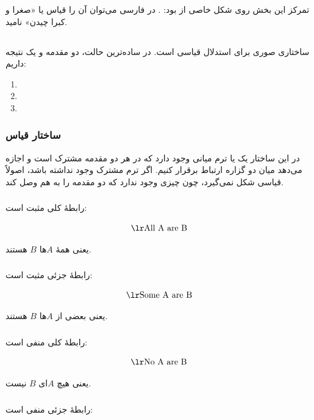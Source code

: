 تمرکز این بخش روی شکل خاصی از  بود: . در فارسی می‌توان آن را قیاس یا «صغرا و کبرا چیدن» نامید.

\subsection{}
 ساختاری صوری برای استدلال قیاسی است. در ساده‌ترین حالت، دو مقدمه و یک نتیجه داریم:

\begin{enumerate}
  \item {}
  \item {}
  \item {}
\end{enumerate}

\subsubsection{ساختار قیاس}
در این ساختار یک  یا ترم میانی وجود دارد که در هر دو مقدمه مشترک است و اجازه می‌دهد میان دو گزاره ارتباط برقرار کنیم. اگر ترم مشترک وجود نداشته باشد، اصولاً قیاسی شکل نمی‌گیرد، چون چیزی وجود ندارد که دو مقدمه را به هم وصل کند.

\subsubsection{}
 رابطهٔ کلی مثبت است:

\[
\text{\eng{All A are B}}
\]

یعنی همهٔ \(A\)ها \(B\) هستند.

\subsubsection{}
 رابطهٔ جزئی مثبت است:

\[
\text{\eng{Some A are B}}
\]

یعنی بعضی از \(A\)ها \(B\) هستند.

\subsubsection{}
 رابطهٔ کلی منفی است:

\[
\text{\eng{No A are B}}
\]

یعنی هیچ \(A\)ای \(B\) نیست.

\subsubsection{}
 رابطهٔ جزئی منفی است:

